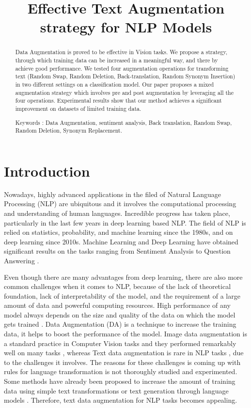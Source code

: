 \documentclass{article}
\title{Effective Text Augmentation strategy for NLP Models}
\begin{document}
\maketitle

\begin{abstract}
Data Augmentation is proved to be effective in Vision tasks. We propose a strategy, through which training data can be increased in a meaningful way, and there by achieve good performance. We tested four augmentation operations for transforming text (Random Swap, Random Deletion, Back-translation, Random Synonym Insertion) in two different settings on a classification model. Our paper proposes a mixed augmentation strategy which involves pre and post augmentation by leveraging all the four operations. Experimental results show that our method achieves a significant improvement on datasets of limited training data.

Keywords :  Data Augmentation, sentiment analysis, Back translation, Random Swap, Random Deletion, Synonym Replacement.


\end{abstract}

 

\section{Introduction}
Nowadays, highly advanced applications in the filed of Natural Language Processing (NLP) are ubiquitous and it involves the computational processing and understanding of human languages. Incredible progress has taken place, particularly in the last few years in deep learning based NLP. The field of NLP is relied on statistics, probability, and machine learning since the 1980s, and on deep learning since 2010s\cite{otter2020survey}.  Machine Learning and Deep Learning have obtained significant results on the tasks ranging from Sentiment Analysis \cite{tang2015deep} to Question Answering \cite{malinowski2017ask}. 

Even though there are many advantages from deep learning, there are also more common challenges \cite{li2017deep} when it comes to NLP, because of the lack of theoretical foundation, lack of interpretability of the model, and the requirement of a large amount of data and powerful computing resources. High performance of any model always depends on the size and quality of the data on which the model gets trained \cite{pepe2013testing}. Data Augmentation (DA) is a technique to increase the training data, it helps to boost the performance of the model. Image data augmentation is a standard practice in Computer Vision tasks and they performed remarkably well on many tasks \cite{perez2017effectiveness, shorten2019survey}, whereas Text data augmentation is rare in NLP tasks \cite{young2018recent}, due to the challenges it involves. The reasons for these challenges is coming up with rules for language transformation is not thoroughly studied and experimented. Some methods have already been proposed to increase the amount of training data using simple text transformations or text generation through language models \cite{abonizio2020pre}. Therefore, text data augmentation for NLP tasks becomes appealing.
\end{document}
